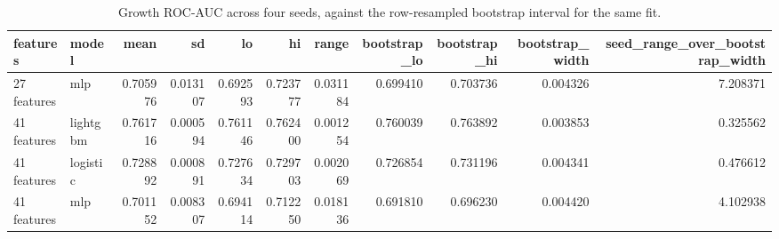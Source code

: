 \begin{table}
\caption{Growth ROC-AUC across four seeds, against the row-resampled bootstrap interval for the same fit.}
\label{tab:17_growth_seed_spread}
\begin{tabular}{llrrrrrrrrr}
\toprule
features & model & mean & sd & lo & hi & range & bootstrap_lo & bootstrap_hi & bootstrap_width & seed_range_over_bootstrap_width \\
\midrule
27 features & mlp & 0.705976 & 0.013107 & 0.692593 & 0.723777 & 0.031184 & 0.699410 & 0.703736 & 0.004326 & 7.208371 \\
41 features & lightgbm & 0.761716 & 0.000594 & 0.761146 & 0.762400 & 0.001254 & 0.760039 & 0.763892 & 0.003853 & 0.325562 \\
41 features & logistic & 0.728892 & 0.000891 & 0.727634 & 0.729703 & 0.002069 & 0.726854 & 0.731196 & 0.004341 & 0.476612 \\
41 features & mlp & 0.701152 & 0.008307 & 0.694114 & 0.712250 & 0.018136 & 0.691810 & 0.696230 & 0.004420 & 4.102938 \\
\bottomrule
\end{tabular}
\end{table}

